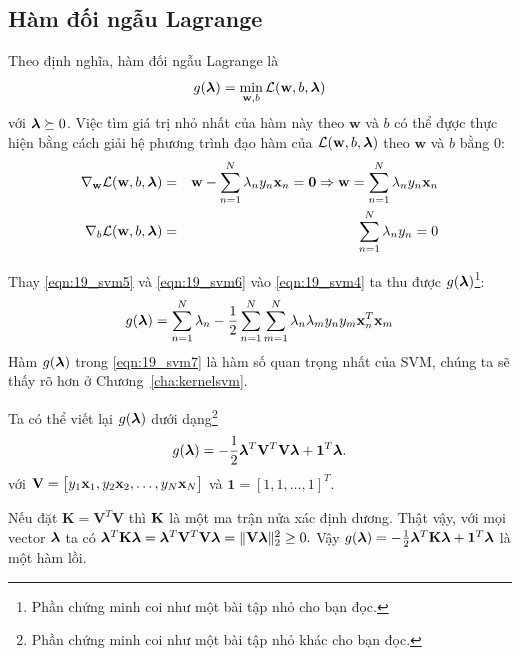 \subsection{Hàm đối ngẫu Lagrange}
Theo định nghĩa, hàm đối ngẫu Lagrange là
\begin{equation*}
g(\boldsymbol{\lambda}) = \min_{\mathbf{w}, b} \mathcal{L}(\mathbf{w}, b, \boldsymbol{\lambda})
\end{equation*}
với $\boldsymbol{\lambda} \succeq 0$. Việc tìm giá trị nhỏ nhất của hàm này theo $\mathbf{w}$
và $b$ có thể đựợc thực hiện bằng cách giải hệ phương trình đạo hàm của $\mathcal{L}(\mathbf{w}, b, \boldsymbol{\lambda})$ theo $\mathbf{w}$ và $b$ bằng 0:
\begin{eqnarray}
\label{eqn:19_svm5}
\nabla_{\mathbf{w}}\mathcal{L}(\mathbf{w}, b, \boldsymbol{\lambda}) &=&
\mathbf{w} - \sum_{n=1}^N \lambda_n y_n \mathbf{x}_n = \mathbf{0} \Rightarrow
\mathbf{w} = \sum_{n=1}^N \lambda_n y_n \mathbf{x}_n \\\
\label{eqn:19_svm6}
\nabla_{b}\mathcal{L}(\mathbf{w}, b, \boldsymbol{\lambda}) &=&
\sum_{n=1}^N \lambda_ny_n = 0
\end{eqnarray}

Thay \eqref{eqn:19_svm5} và \eqref{eqn:19_svm6} vào \eqref{eqn:19_svm4} ta thu
được $g(\boldsymbol{\lambda})$\footnote{Phần chứng minh coi như một bài tập nhỏ cho bạn
đọc.}:
\begin{equation}
\label{eqn:19_svm7}
g(\boldsymbol{\lambda}) = \sum_{n=1}^N \lambda_n  -\frac{1}{2}\sum_{n=1}^N \sum_{m=1}^N \lambda_n\lambda_m y_n y_m \mathbf{x}_n^T\mathbf{x}_m
\end{equation}
Hàm $g(\boldsymbol{\lambda})$ trong \eqref{eqn:19_svm7} {là hàm số quan trọng nhất
của SVM}, chúng ta sẽ thấy rõ hơn ở Chương~\ref{cha:kernelsvm}.


Ta có thể viết lại $g(\boldsymbol{\lambda})$
dưới dạng\footnote{Phần chứng minh coi như một bài tập nhỏ khác cho bạn đọc.}
\begin{equation}
\label{eqn:19_svm8}
g(\boldsymbol{\lambda}) = -\frac{1}{2}\boldsymbol{\lambda}^T\mathbf{V}^T\mathbf{V}\mathbf{\boldsymbol{\lambda}} + \mathbf{1}^T\boldsymbol{\lambda}.
\end{equation}
với
\begin{math}
\mathbf{V} = \left[\begin{matrix} y_1 \mathbf{x}_1, y_2 \mathbf{x}_2, \dots, y_N \mathbf{x}_N \end{matrix}\right]
\end{math}
và $\mathbf{1} = [1, 1, \dots, 1]^T$.

Nếu đặt $\mathbf{K} = \mathbf{V}^T\mathbf{V}$ thì $\mathbf{K}$ là một ma trận nửa xác
định dương. Thật vậy, với mọi vector $\boldsymbol{\lambda}$ ta có $\boldsymbol{\lambda}^T\mathbf{K}\mathbf{\boldsymbol{\lambda}} = \boldsymbol{\lambda}^T\mathbf{V}^T\mathbf{V}\mathbf{\boldsymbol{\lambda}} = \|\mathbf{V}\boldsymbol{\lambda}\|_2^2 \geq 0.$
Vậy $g(\boldsymbol{\lambda}) = -\frac{1}{2}\boldsymbol{\lambda}^T\mathbf{K}\mathbf{\boldsymbol{\lambda}} + \mathbf{1}^T\boldsymbol{\lambda}$ là một hàm lồi.




